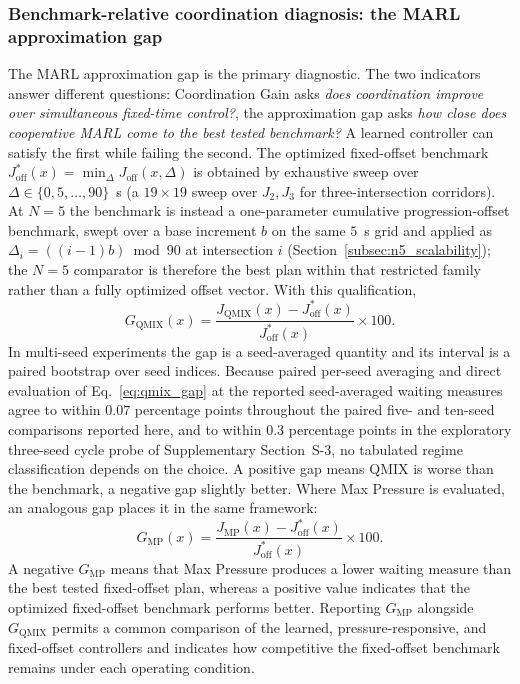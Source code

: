 \documentclass[review,12pt]{elsarticle}
\begin{document}
\subsubsection{Benchmark-relative coordination diagnosis: the MARL approximation gap}
\label{subsubsec:marl_gap}

The MARL approximation gap is the primary diagnostic. The two indicators answer different questions: Coordination Gain asks \textit{does coordination improve over simultaneous fixed-time control?}, the approximation gap asks \textit{how close does cooperative MARL come to the best tested benchmark?} A learned controller can satisfy the first while failing the second. The optimized fixed-offset benchmark $J_{\mathrm{off}}^{*}(x)=\min_{\Delta}J_{\mathrm{off}}(x,\Delta)$ is obtained by exhaustive sweep over $\Delta\in\{0,5,\ldots,90\}$~s (a $19\times19$ sweep over $J_2,J_3$ for three-intersection corridors). At $N=5$ the benchmark is instead a one-parameter cumulative progression-offset benchmark, swept over a base increment $b$ on the same $5$~s grid and applied as $\Delta_i=((i-1)b)\bmod90$ at intersection $i$ (Section~\ref{subsec:n5_scalability}); the $N=5$ comparator is therefore the best plan within that restricted family rather than a fully optimized offset vector. With this qualification,
\begin{equation}
G_{\mathrm{QMIX}}(x)=
\frac{J_{\mathrm{QMIX}}(x)-J_{\mathrm{off}}^{*}(x)}{J_{\mathrm{off}}^{*}(x)}
\times 100 .
\label{eq:qmix_gap}
\end{equation}
In multi-seed experiments the gap is a seed-averaged quantity and its interval is a paired bootstrap over seed indices. Because paired per-seed averaging and direct evaluation of Eq.~\eqref{eq:qmix_gap} at the reported seed-averaged waiting measures agree to within $0.07$ percentage points throughout the paired five- and ten-seed comparisons reported here, and to within $0.3$ percentage points in the exploratory three-seed cycle probe of Supplementary Section~S-3, no tabulated regime classification depends on the choice. A positive gap means QMIX is worse than the benchmark, a negative gap slightly better. Where Max Pressure is evaluated, an analogous gap places it in the same framework:
\begin{equation}
G_{\mathrm{MP}}(x)=
\frac{J_{\mathrm{MP}}(x)-J_{\mathrm{off}}^{*}(x)}{J_{\mathrm{off}}^{*}(x)}
\times 100 .
\label{eq:max_pressure_gap}
\end{equation}
A negative $G_{\mathrm{MP}}$ means that Max Pressure produces a
lower waiting measure than the best tested fixed-offset plan, whereas
a positive value indicates that the optimized fixed-offset benchmark
performs better. Reporting $G_{\mathrm{MP}}$ alongside
$G_{\mathrm{QMIX}}$ permits a common comparison of the learned,
pressure-responsive, and fixed-offset controllers and indicates how
competitive the fixed-offset benchmark remains under each operating condition.
\end{document}
